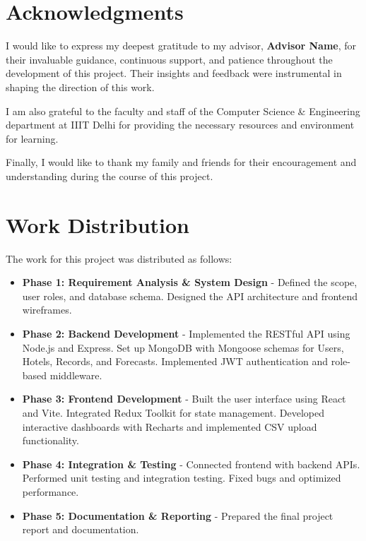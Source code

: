 \documentclass[letterpaper,11pt]{report}
\begin{document}
\newpage

\section*{Acknowledgments}\label{section:acknowledgments}
\pagestyle{plain}

I would like to express my deepest gratitude to my advisor, \textbf{Advisor Name}, for their invaluable guidance, continuous support, and patience throughout the development of this project. Their insights and feedback were instrumental in shaping the direction of this work.

I am also grateful to the faculty and staff of the Computer Science \& Engineering department at IIIT Delhi for providing the necessary resources and environment for learning.

Finally, I would like to thank my family and friends for their encouragement and understanding during the course of this project.

\vspace{2in}
\section*{Work Distribution}
The work for this project was distributed as follows:

\begin{itemize}
    \item \textbf{Phase 1: Requirement Analysis \& System Design} - Defined the scope, user roles, and database schema. Designed the API architecture and frontend wireframes.
    \item \textbf{Phase 2: Backend Development} - Implemented the RESTful API using Node.js and Express. Set up MongoDB with Mongoose schemas for Users, Hotels, Records, and Forecasts. Implemented JWT authentication and role-based middleware.
    \item \textbf{Phase 3: Frontend Development} - Built the user interface using React and Vite. Integrated Redux Toolkit for state management. Developed interactive dashboards with Recharts and implemented CSV upload functionality.
    \item \textbf{Phase 4: Integration \& Testing} - Connected frontend with backend APIs. Performed unit testing and integration testing. Fixed bugs and optimized performance.
    \item \textbf{Phase 5: Documentation & Reporting} - Prepared the final project report and documentation.
\end{itemize}
\end{document}
